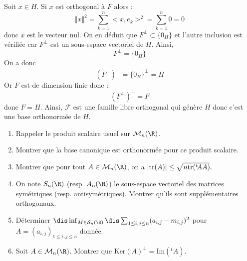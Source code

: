 \documentclass[a4paper,10pt]{report}
\begin{document}
\medskip

\noindent Soit $x \in H$. Si $x$ est orthogonal à $F$ alors :
$$ \Vert x \Vert^2= \sum_{k=1}^n <x,e_k>^2 = \sum_{k=1}^n  0 = 0$$
donc $x$ est le vecteur nul. On en déduit que $F^{\perp} \subset \lbrace 0_H \rbrace$ et l'autre inclusion est vérifiée car $F^{\perp}$ est un sous-espace vectoriel de $H$. Ainsi,
$$ F^{\perp} = \lbrace 0_H \rbrace$$
On a donc 
$$ (F^{\perp})^{\perp} = \lbrace 0_H \rbrace^{\perp} = H$$
Or $F$ est de dimension finie donc :
$$ (F^{\perp})^{\perp} = F$$
donc $F=H$. Ainsi, $\mathcal{F}$ est une famille libre orthogonal qui génère $H$ donc c'est une base orthonormée de $H$.


\begin{Exa} \begin{enumerate}
	\item Rappeler le produit scalaire usuel sur ${\cal M}_n(\R)$.
	
\item Montrer que la base canonique est orthonormée pour ce produit scalaire.

\item Montrer que pour tout $A\in{\cal M}_n(\R)$, on a  $|$tr$(A)|\leq \sqrt{n\hbox{tr}(^t\!AA)}.$
	
\item On note $S_n(\R)$ (resp. $A_n(\R)$)	le sous-espace vectoriel des matrices sym\'etriques (resp. antisym\'etriques). Montrer qu'ils sont suppl\'ementaires orthogonaux.

\item Déterminer $\dis\inf_{M\in{\cal S}_n(\R)}\dis\sum_{1 \leq i,j \leq n}(a_{i,j}-m_{i,j})^2$ pour $A=(a_{i,j})_{1 \leq i,j \leq n}$ donn\'ee.
\item Soit $A\in{\cal M}_n(\R)$. Montrer que $\textrm{Ker}(A)^{\perp}= \textrm{Im}(^t\!A)$.
\end{enumerate}
\end{Exa}

\corr 
\end{document}
